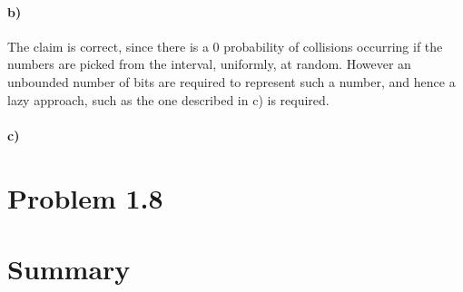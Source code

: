 \documentclass[12pt]{article}
\begin{document}
\paragraph{b)} The claim is correct, since there is a 0 probability of collisions occurring if the numbers are picked from the interval, uniformly, at random. However an unbounded number of bits are required to represent such a number, and hence a lazy approach, such as the one described in c) is required.

\paragraph{c)} 


\section*{Problem 1.8}

\pagebreak

\section*{Summary}
\end{document}
